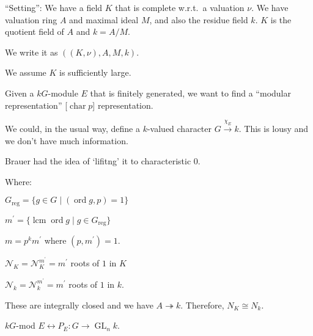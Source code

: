 \documentclass{article}
\theoremstyle{definition}
\begin{document}
``Setting'': We have a field \(K\) that is complete w.r.t.\ a valuation \(\nu\). We have valuation ring \(A\) and maximal ideal \(M\), and also the residue field \(k\). \(K\) is the quotient field of \(A\) and \(k = A / M\).

We write it as \(((K, \nu), A, M , k)\).

We assume \(K\) is sufficiently large.

Given a \(kG\)-module \(E\) that is finitely generated, we want to find a ``modular representation'' [\(\operatorname{char} p\)] representation.

We could, in the usual way, define a \(k\)-valued character \(G \overset{\chi_E}{\to} k\). This is lousy and we don't have much information.

Brauer had the idea of `lifitng' it to characteristic \(0\).

\begin{center}
\end{center}

Where:

\(G_{\text{reg}} = \{ g\in G \mid (\operatorname{ord} g, p) = 1 \} \) 

\(m^{\prime} = \{ \operatorname{lcm} \operatorname{ord} g \mid g\in G_{\text{reg}} \} \) 

\(m = p^k m^{\prime}\) where \((p,m^{\prime}) = 1\).

\(\mathcal{N}_K = \mathcal{N}_K ^{m^{\prime}} = m^{\prime}\) roots of \(1\) in \(K\)

\(\mathcal{N}_k = \mathcal{N}_k^{m^{\prime}} = m^{\prime}\) roots of \(1\) in \(k\). 

These are integrally closed and we have \(A \twoheadrightarrow k\). Therefore, \(N_K \cong N_k\).

\begin{center}
\end{center}

\(kG\)-mod \(E \leftrightarrow P_E : G \to \operatorname{GL}_n k\).
\end{document}
